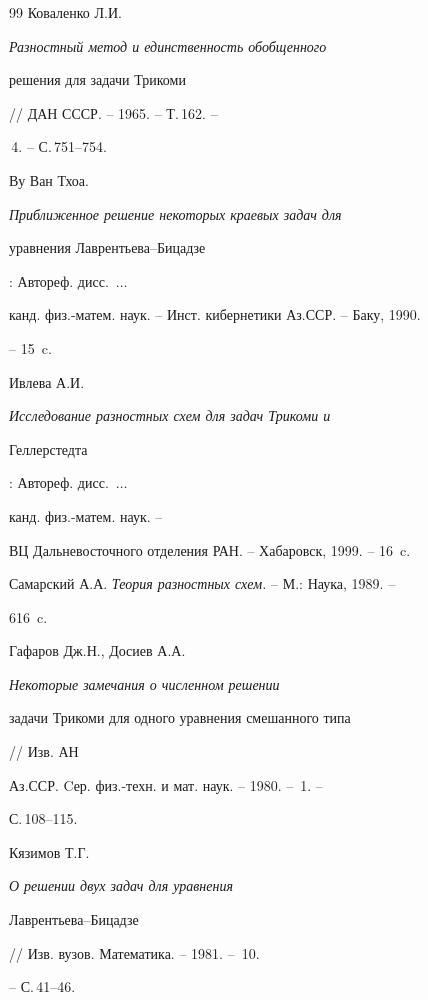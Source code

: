 \begin{thebibliography}{99}
Коваленко Л.И. {\em Разностный метод и единственность обобщенного


решения для задачи Трикоми} // ДАН СССР. -- 1965. -- Т.\,162. --


\No\,4. -- С.\,751--754.







Ву Ван Тхоа. {\em Приближенное решение некоторых краевых задач для


уравнения Лаврентьева--Бицадзе}: Автореф. дисс.~$\dotsc$


канд. физ.-матем. наук. -- Инст. кибернетики Аз.ССР. -- Баку, 1990.


-- 15~c.







Ивлева А.И. {\em Исследование разностных схем для задач Трикоми и


Геллерстедта}: Автореф. дисс.~$\dotsc$


канд. физ.-матем. наук. -- 


ВЦ Дальневосточного отделения РАН. -- Хабаровск, 1999. -- 16~c.







Самарский А.А. {\em Теория разностных схем.} -- М.: Наука, 1989. --


616~c.







Гафаров Дж.Н., Досиев А.А. {\em Некоторые замечания о численном решении


задачи Трикоми для одного уравнения смешанного типа} // Изв. АН 


Аз.ССР. Cер. физ.-техн. и мат. наук. -- 1980. -- \No\,1. -- 


С.\,108--115.







Кязимов Т.Г. {\em О решении двух задач для уравнения 


Лаврентьева--Бицадзе} // Изв. вузов. Математика. -- 1981. -- \No\,10.


-- С.\,41--46.






\end{thebibliography}
